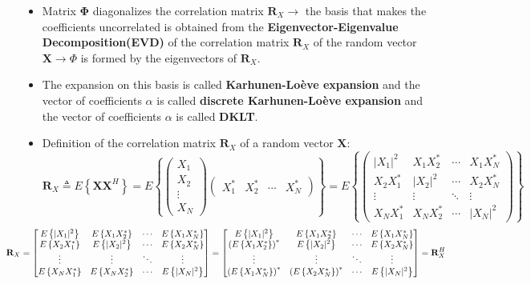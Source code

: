 \begin{itemize}
    \item Matrix \(\mathbf{\Phi}\) diagonalizes the correlation matrix \(\mathbf{R}_X\rightarrow\) the basis that makes the coefficients uncorrelated is obtained from the \textbf{Eigenvector-Eigenvalue Decomposition(EVD)} of the correlation matrix \(\mathbf{R}_X\) of the random vector \(\mathbf{X}\rightarrow\Phi\) is formed by the eigenvectors of \(\mathbf{R}_X\).
    \item The expansion on this basis is called \textbf{Karhunen-Loève expansion} and the vector of coefficients \(\alpha\) is called \textbf{discrete Karhunen-Loève expansion} and the vector of coefficients \(\alpha\) is called \textbf{DKLT}.
    \item Definition of the correlation matrix \(\mathbf{R}_X\) of a random vector \(\mathbf{X}\):
\[
\mathbf{R}_X \triangleq E \left\{ \mathbf{X} \mathbf{X}^H \right\} 
= E \left\{
\begin{pmatrix}
X_1 \\
X_2 \\
\vdots \\
X_N
\end{pmatrix}
\begin{pmatrix}
X_1^{*} & X_2^{*} & \cdots & X_N^{*}
\end{pmatrix}
\right\}
= E \left\{
\begin{pmatrix}
|X_1|^2 & X_1 X_2^{*} & \cdots & X_1 X_N^{*} \\
X_2 X_1^{*} & |X_2|^2 & \cdots & X_2 X_N^{*} \\
\vdots & \vdots & \ddots & \vdots \\
X_N X_1^{*} & X_N X_2^{*} & \cdots & |X_N|^2
\end{pmatrix}
\right\}
\]
\[
\hspace{-4.25em}\mathbf{R}_X =
\begin{bmatrix}
    E \left\{ |X_1|^2 \right\} & E \left\{ X_1 X_2^* \right\} & \cdots & E \left\{ X_1 X_N^* \right\} \\
    E \left\{ X_2 X_1^* \right\} & E \left\{ |X_2|^2 \right\} & \cdots & E \left\{ X_2 X_N^* \right\} \\
    \vdots & \vdots & \ddots & \vdots \\
    E \left\{ X_N X_1^* \right\} & E \left\{ X_N X_2^* \right\} & \cdots & E \left\{ |X_N|^2 \right\}
\end{bmatrix}
=
\begin{bmatrix}
    E \left\{ |X_1|^2 \right\} & E \left\{ X_1 X_2^* \right\} & \cdots & E \left\{ X_1 X_N^* \right\} \\
    \left( E \left\{ X_1 X_2^* \right\} \right)^* & E \left\{ |X_2|^2 \right\} & \cdots & E \left\{ X_2 X_N^* \right\} \\
    \vdots & \vdots & \ddots & \vdots \\
    \left( E \left\{ X_1 X_N^* \right\} \right)^* & \left( E \left\{ X_2 X_N^* \right\} \right)^* & \cdots & E \left\{ |X_N|^2 \right\}
\end{bmatrix}
= 
\mathbf{R}_X^H
\]
\end{itemize}
